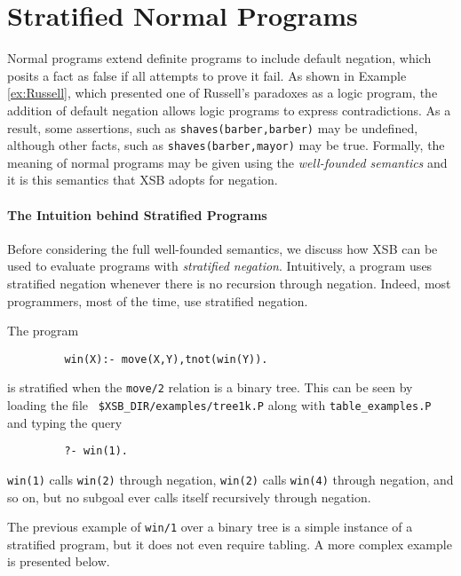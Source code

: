 \section{Stratified Normal Programs}

Normal programs extend definite programs to include default negation,
which posits a fact as false if all attempts to prove it fail.  As
shown in Example \ref{ex:Russell}, which presented one of Russell's
paradoxes as a logic program, the addition of default negation allows
logic programs to express contradictions.  As a result, some
assertions, such as {\tt shaves(barber,barber)} may be undefined,
although other facts, such as {\tt shaves(barber,mayor)} may be true.
Formally, the meaning of normal programs may be given using the {\em
well-founded semantics} and it is this semantics that XSB adopts for
negation.

\paragraph*{The Intuition behind Stratified Programs}

Before considering the full well-founded semantics, we discuss how XSB
can be used to evaluate programs with {\em stratified negation}.
Intuitively, a program uses stratified negation whenever there is no
recursion through negation.  Indeed, most programmers, most of the
time, use stratified negation.  

\begin{exercise} \label{ex:win1}
The program
\begin{verbatim}
         win(X):- move(X,Y),tnot(win(Y)).
\end{verbatim}
is stratified when the {\tt move/2} relation is a binary tree.  This
can be seen by loading the file {\tt
\verb|$XSB_DIR/examples/|tree1k.P} along with {\tt table\_examples.P}
and typing the query
\begin{verbatim}
         ?- win(1).
\end{verbatim}
{\tt win(1)} calls {\tt win(2)} through negation, {\tt win(2)} calls
{\tt win(4)} through negation, and so on, but no subgoal ever calls
itself recursively through negation.
\end{exercise}

The previous example of {\tt win/1} over a binary tree is a simple
instance of a stratified program, but it does not even require
tabling.  A more complex example is presented below.

